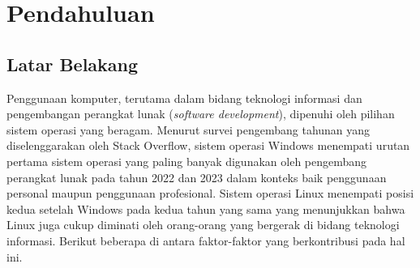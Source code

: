 \chapter{Pendahuluan}

\section{Latar Belakang}

Penggunaan komputer, terutama dalam bidang teknologi informasi dan pengembangan perangkat lunak (\textit{software development}), dipenuhi oleh pilihan sistem operasi yang beragam. Menurut survei pengembang tahunan yang diselenggarakan oleh Stack Overflow, sistem operasi Windows menempati urutan pertama sistem operasi yang paling banyak digunakan oleh pengembang perangkat lunak pada tahun 2022 \cite{stackoverflow-developer-survey-2022-most-popular-os} dan 2023 \cite{stackoverflow-developer-survey-2023-most-popular-os} dalam konteks baik penggunaan personal maupun penggunaan profesional. Sistem operasi Linux menempati posisi kedua setelah Windows pada kedua tahun yang sama yang menunjukkan bahwa Linux juga cukup diminati oleh orang-orang yang bergerak di bidang teknologi informasi. Berikut beberapa di antara faktor-faktor yang berkontribusi pada hal ini.
